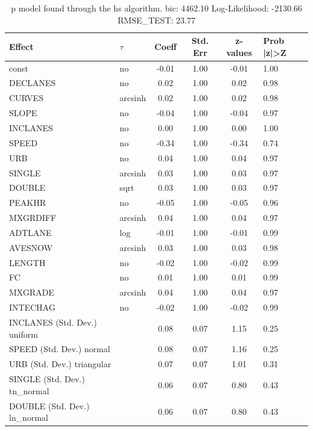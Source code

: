 \begin{table}
	\caption{p model found through the hs algorithm. bic: 4462.10 Log-Likelihood: -2130.66 RMSE_TEST: 23.77}
	\begin{center}
		\begin{tabular}{|l|l|c|c|c|l|}
			\hline
			Effect & $\tau$ & Coeff & Std. Err & z-values & Prob |z|>Z \\
			\hline
			const & no & -0.01 & 1.00 & -0.01 & 1.00 \\
			\hline
			DECLANES & no & 0.02 & 1.00 & 0.02 & 0.98 \\
			\hline
			CURVES & arcsinh & 0.02 & 1.00 & 0.02 & 0.98 \\
			\hline
			SLOPE & no & -0.04 & 1.00 & -0.04 & 0.97 \\
			\hline
			INCLANES & no & 0.00 & 1.00 & 0.00 & 1.00 \\
			\hline
			SPEED & no & -0.34 & 1.00 & -0.34 & 0.74 \\
			\hline
			URB & no & 0.04 & 1.00 & 0.04 & 0.97 \\
			\hline
			SINGLE & arcsinh & 0.03 & 1.00 & 0.03 & 0.97 \\
			\hline
			DOUBLE & sqrt & 0.03 & 1.00 & 0.03 & 0.97 \\
			\hline
			PEAKHR & no & -0.05 & 1.00 & -0.05 & 0.96 \\
			\hline
			MXGRDIFF & arcsinh & 0.04 & 1.00 & 0.04 & 0.97 \\
			\hline
			ADTLANE & log & -0.01 & 1.00 & -0.01 & 0.99 \\
			\hline
			AVESNOW & arcsinh & 0.03 & 1.00 & 0.03 & 0.98 \\
			\hline
			LENGTH & no & -0.02 & 1.00 & -0.02 & 0.99 \\
			\hline
			FC & no & 0.01 & 1.00 & 0.01 & 0.99 \\
			\hline
			MXGRADE & arcsinh & 0.04 & 1.00 & 0.04 & 0.97 \\
			\hline
			INTECHAG & no & -0.02 & 1.00 & -0.02 & 0.99 \\
			\hline
			INCLANES (Std. Dev.) uniform &  & 0.08 & 0.07 & 1.15 & 0.25 \\
			\hline
			SPEED (Std. Dev.) normal &  & 0.08 & 0.07 & 1.16 & 0.25 \\
			\hline
			URB (Std. Dev.) triangular &  & 0.07 & 0.07 & 1.01 & 0.31 \\
			\hline
			SINGLE (Std. Dev.) tn_normal &  & 0.06 & 0.07 & 0.80 & 0.43 \\
			\hline
			DOUBLE (Std. Dev.) ln_normal &  & 0.06 & 0.07 & 0.80 & 0.43 \\

\end{tabular}
\end{center}
\end{table}
